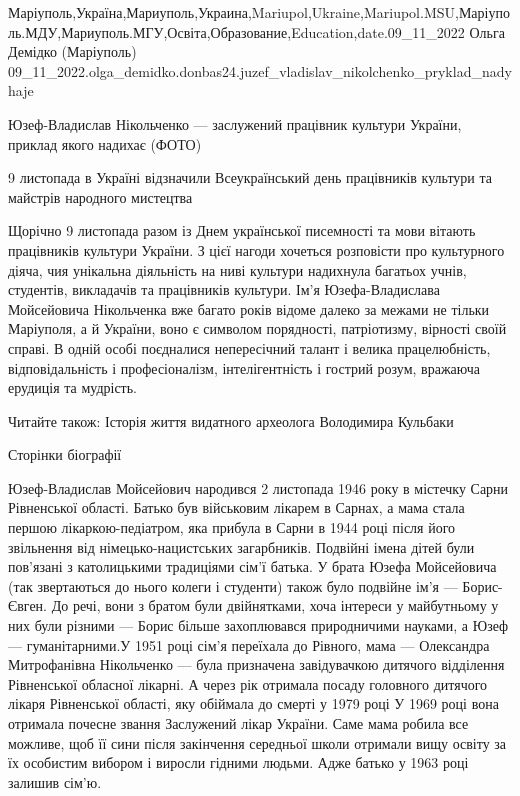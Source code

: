  
 
 
 
 

Маріуполь,Україна,Мариуполь,Украина,Mariupol,Ukraine,Mariupol.MSU,Маріуполь.МДУ,Мариуполь.МГУ,Освіта,Образование,Education,date.09_11_2022
Ольга Демідко (Маріуполь)
09_11_2022.olga_demidko.donbas24.juzef_vladislav_nikolchenko_pryklad_nadyhaje

Юзеф-Владислав Нікольченко — заслужений працівник культури України, приклад
якого надихає (ФОТО)

9 листопада в Україні відзначили Всеукраїнський день працівників культури та
майстрів народного мистецтва

Щорічно 9 листопада разом із Днем української писемності та мови вітають
працівників культури України. З цієї нагоди хочеться розповісти про культурного
діяча, чия унікальна діяльність на ниві культури надихнула багатьох учнів,
студентів, викладачів та працівників культури. Ім'я Юзефа-Владислава
Мойсейовича Нікольченка вже багато років відоме далеко за межами не тільки
Маріуполя, а й України, воно є символом порядності, патріотизму, вірності своїй
справі. В одній особі поєдналися непересічний талант і велика працелюбність,
відповідальність і професіоналізм, інтелігентність і гострий розум, вражаюча
ерудиція та мудрість.

Читайте також: Історія життя видатного археолога Володимира Кульбаки

Сторінки біографії

Юзеф-Владислав Мойсейович народився 2 листопада 1946 року в містечку Сарни
Рівненської області. Батько був військовим лікарем в Сарнах, а мама стала
першою лікаркою-педіатром, яка прибула в Сарни в 1944 році після його
звільнення від німецько-нацистських загарбників. Подвійні імена дітей були
пов’язані з католицькими традиціями сім'ї батька. У брата Юзефа Мойсейовича
(так звертаються до нього колеги і студенти) також було подвійне ім'я —
Борис-Євген. До речі, вони з братом були двійнятками, хоча інтереси у
майбутньому у них були різними — Борис більше захоплювався природничими
науками, а Юзеф — гуманітарними.У 1951 році сім'я переїхала до Рівного, мама —
Олександра Митрофанівна Нікольченко — була призначена завідувачкою дитячого
відділення Рівненської обласної лікарні. А через рік отримала посаду головного
дитячого лікаря Рівненської області, яку обіймала до смерті у 1979 році У 1969
році вона отримала почесне звання Заслужений лікар України. Саме мама робила
все можливе, щоб її сини після закінчення середньої школи отримали вищу освіту
за їх особистим вибором і виросли гідними людьми. Адже батько у 1963 році
залишив сім'ю.

